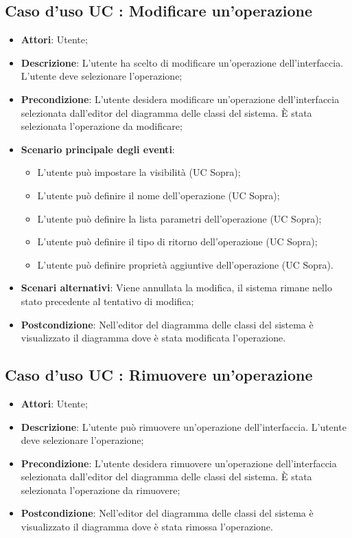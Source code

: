 \documentclass[../AnalisiDeiRequisiti.tex]{subfiles}
\begin{document}
		\subsection{Caso d'uso UC : Modificare un'operazione}
			\begin{itemize}
				\item \textbf{Attori}: Utente;
				\item \textbf{Descrizione}: L'utente ha scelto di modificare un'operazione
				dell'interfaccia. L'utente deve selezionare l'operazione;
				\item \textbf{Precondizione}: L'utente desidera modificare un'operazione
				dell'interfaccia selezionata dall'editor del diagramma delle classi del
				sistema. È stata selezionata l'operazione da modificare;
				\item \textbf{Scenario principale degli eventi}:
					\begin{itemize}
						\item L'utente può impostare la visibilità (UC Sopra);
						\item L'utente può definire il nome dell'operazione (UC Sopra);
						\item L'utente può definire la lista parametri dell'operazione (UC Sopra);
						\item L'utente può definire il tipo di ritorno dell'operazione (UC Sopra);
						\item L'utente può definire proprietà aggiuntive dell'operazione (UC Sopra).
					\end{itemize}
				\item \textbf{Scenari alternativi}: Viene annullata la modifica, il sistema
				rimane nello stato precedente al tentativo di modifica;
				\item \textbf{Postcondizione}: Nell'editor del diagramma delle classi del
				sistema è visualizzato il diagramma dove è stata modificata l'operazione.
			\end{itemize}
		\subsection{Caso d'uso UC : Rimuovere un'operazione}
			\begin{itemize}
				\item \textbf{Attori}: Utente;
				\item \textbf{Descrizione}: L'utente può rimuovere un'operazione
				dell'interfaccia. L'utente deve selezionare l'operazione;
				\item \textbf{Precondizione}: L'utente desidera rimuovere un'operazione
				dell'interfaccia selezionata dall'editor del diagramma delle classi del
				sistema. È stata selezionata l'operazione da rimuovere;
				\item \textbf{Postcondizione}: Nell'editor del diagramma delle classi del
				sistema è visualizzato il diagramma dove è stata rimossa l'operazione.
			\end{itemize}
\end{document}
